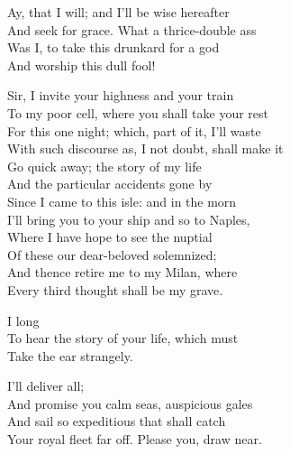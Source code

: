 \begin{verse_speech}[Caliban] 
Ay, that I will; and I'll be wise hereafter\\
And seek for grace. What a thrice-double ass\\
Was I, to take this drunkard for a god\\
And worship this dull fool!
\end{verse_speech}





\begin{verse_speech}[Prospero] 
Sir, I invite your highness and your train\\
To my poor cell, where you shall take your rest\\
For this one night; which, part of it, I'll waste\\
With such discourse as, I not doubt, shall make it\\
Go quick away; the story of my life\\
And the particular accidents gone by\\
Since I came to this isle: and in the morn\\
I'll bring you to your ship and so to Naples,\\
Where I have hope to see the nuptial\\
Of these our dear-beloved solemnized;\\
And thence retire me to my Milan, where\\
Every third thought shall be my grave.
\end{verse_speech}

\begin{verse_speech}[Alonso] 
I long\\
To hear the story of your life, which must\\
Take the ear strangely.
\end{verse_speech}

\begin{verse_speech}[Prospero] 
I'll deliver all;\\
And promise you calm seas, auspicious gales\\
And sail so expeditious that shall catch\\
Your royal fleet far off.
Please you, draw near.
\end{verse_speech}

